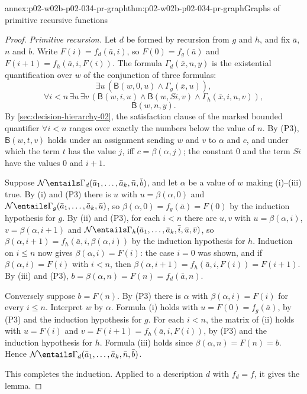 \begin{annexitem}{annex:p02-w02b-p02-034-pr-graph}{thm:p02-w02b-p02-034-pr-graph}{Graphs of primitive recursive functions}
\begin{proof}
\emph{Primitive recursion.}  Let \(d\) be formed by recursion from \(g\) and
\(h\), and fix \(\bar a\), \(n\) and \(b\).  Write \(F(i)=f_d(\bar a,i)\), so
\(F(0)=f_g(\bar a)\) and \(F(i+1)=f_h(\bar a,i,F(i))\).  The formula
\(\Gamma_d(\bar x,n,y)\) is the existential quantification over \(w\) of the
conjunction of three formulas:
\[
 \exists u\,(\mathsf B(w,0,u)\land\Gamma_g(\bar x,u)),
 \tag{i}
\]
\[
 \forall i<n\,\exists u\,\exists v\,
 (\mathsf B(w,i,u)\land\mathsf B(w,Si,v)\land\Gamma_h(\bar x,i,u,v)),
 \tag{ii}
\]
\[
 \mathsf B(w,n,y).
 \tag{iii}
\]
By \cref{sec:decision-hierarchy-02}, the satisfaction clause of the marked
bounded quantifier \(\forall i<n\) ranges over exactly the numbers below the
value of \(n\).  By (P3), \(\mathsf B(w,t,v)\) holds under an assignment
sending \(w\) and \(v\) to \(\alpha\) and \(c\), and under which the term
\(t\) has the value \(j\), iff \(c=\beta(\alpha,j)\); the constant \(0\) and
the term \(Si\) have the values \(0\) and \(i+1\).

Suppose \(\mathcal N\entails\Gamma_d(\bar a_1,\ldots,\bar a_k,\bar n,\bar b)\),
and let \(\alpha\) be a value of \(w\) making (i)--(iii) true.  By (i) and
(P3) there is \(u\) with \(u=\beta(\alpha,0)\) and
\(\mathcal N\entails\Gamma_g(\bar a_1,\ldots,\bar a_k,\bar u)\), so
\(\beta(\alpha,0)=f_g(\bar a)=F(0)\) by the induction hypothesis for \(g\).
By (ii) and (P3), for each \(i<n\) there are \(u,v\) with
\(u=\beta(\alpha,i)\), \(v=\beta(\alpha,i+1)\) and
\(\mathcal N\entails\Gamma_h(\bar a_1,\ldots,\bar a_k,\bar i,\bar u,\bar v)\),
so \(\beta(\alpha,i+1)=f_h(\bar a,i,\beta(\alpha,i))\) by the induction
hypothesis for \(h\).  Induction on \(i\le n\) now gives
\(\beta(\alpha,i)=F(i)\): the case \(i=0\) was shown, and if
\(\beta(\alpha,i)=F(i)\) with \(i<n\), then
\(\beta(\alpha,i+1)=f_h(\bar a,i,F(i))=F(i+1)\).  By (iii) and (P3),
\(b=\beta(\alpha,n)=F(n)=f_d(\bar a,n)\).

Conversely suppose \(b=F(n)\).  By (P3) there is \(\alpha\) with
\(\beta(\alpha,i)=F(i)\) for every \(i\le n\).  Interpret \(w\) by
\(\alpha\).  Formula (i) holds with \(u=F(0)=f_g(\bar a)\), by (P3) and the
induction hypothesis for \(g\).  For each \(i<n\), the matrix of (ii) holds
with \(u=F(i)\) and \(v=F(i+1)=f_h(\bar a,i,F(i))\), by (P3) and the
induction hypothesis for \(h\).  Formula (iii) holds since
\(\beta(\alpha,n)=F(n)=b\).  Hence
\(\mathcal N\entails\Gamma_d(\bar a_1,\ldots,\bar a_k,\bar n,\bar b)\).

This completes the induction.  Applied to a description \(d\) with
\(f_d=f\), it gives the lemma.
\end{proof}
\end{annexitem}

